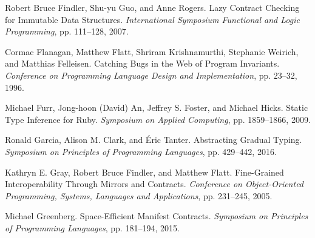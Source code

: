\documentclass[screen=true, 10pt, acmsmall]{acmart}
\newenvironment{SingleColumn}{\begin{list}{}{\topsep=0pt\partopsep=0pt%
\listparindent=0pt\itemindent=0pt\labelwidth=0pt\leftmargin=0pt\rightmargin=0pt%
\itemsep=0pt\parsep=0pt}\item}{\end{list}}
\newenvironment{AutoBibliography}{\begin{small}}{\end{small}}
\newcommand{\Autobibentry}[1]{\hspace{0.05\linewidth}\parbox[t]{0.95\linewidth}{\parindent=-0.05\linewidth#1\vspace{1.0ex}}}
\begin{document}
\begin{AutoBibliography}
\begin{SingleColumn}
\label{t:x28autobib_x22Robert_Bruce_Findlerx2c_Shux2dyu_Guox2c_and_Anne_RogersLazy_Contract_Checking_for_Immutable_Data_StructuresInternational_Symposium_Functional_and_Logic_Programmingx2c_ppx2e_111x2dx2d1282007x22x29}\Autobibentry{Robert Bruce Findler, Shu{-}yu Guo, and Anne Rogers. Lazy Contract Checking for Immutable Data Structures. \textit{International Symposium Functional and Logic Programming}, pp. 111{--}128, 2007.}

\label{t:x28autobib_x22Cormac_Flanaganx2c_Matthew_Flattx2c_Shriram_Krishnamurthix2c_Stephanie_Weirichx2c_and_Matthias_FelleisenCatching_Bugs_in_the_Web_of_Program_InvariantsConference_on_Programming_Language_Design_and_Implementationx2c_ppx2e_23x2dx2d321996x22x29}\Autobibentry{Cormac Flanagan, Matthew Flatt, Shriram Krishnamurthi, Stephanie Weirich, and Matthias Felleisen. Catching Bugs in the Web of Program Invariants. \textit{Conference on Programming Language Design and Implementation}, pp. 23{--}32, 1996.}

\label{t:x28autobib_x22Michael_Furrx2c_Jongx2dhoon_x28Davidx29_Anx2c_Jeffrey_Sx2e_Fosterx2c_and_Michael_HicksStatic_Type_Inference_for_RubySymposium_on_Applied_Computingx2c_ppx2e_1859x2dx2d18662009x22x29}\Autobibentry{Michael Furr, Jong{-}hoon (David) An, Jeffrey S. Foster, and Michael Hicks. Static Type Inference for Ruby. \textit{Symposium on Applied Computing}, pp. 1859{--}1866, 2009.}

\label{t:x28autobib_x22Ronald_Garciax2c_Alison_Mx2e_Clarkx2c_and_xc9ric_TanterAbstracting_Gradual_TypingSymposium_on_Principles_of_Programming_Languagesx2c_ppx2e_429x2dx2d4422016x22x29}\Autobibentry{Ronald Garcia, Alison M. Clark, and \'{E}ric Tanter. Abstracting Gradual Typing. \textit{Symposium on Principles of Programming Languages}, pp. 429{--}442, 2016.}

\label{t:x28autobib_x22Kathryn_Ex2e_Grayx2c_Robert_Bruce_Findlerx2c_and_Matthew_FlattFinex2dGrained_Interoperability_Through_Mirrors_and_ContractsConference_on_Objectx2dOriented_Programmingx2c_Systemsx2c_Languages_and_Applicationsx2c_ppx2e_231x2dx2d2452005x22x29}\Autobibentry{Kathryn E. Gray, Robert Bruce Findler, and Matthew Flatt. Fine{-}Grained Interoperability Through Mirrors and Contracts. \textit{Conference on Object{-}Oriented Programming, Systems, Languages and Applications}, pp. 231{--}245, 2005.}

\label{t:x28autobib_x22Michael_GreenbergSpacex2dEfficient_Manifest_ContractsSymposium_on_Principles_of_Programming_Languagesx2c_ppx2e_181x2dx2d1942015x22x29}\Autobibentry{Michael Greenberg. Space{-}Efficient Manifest Contracts. \textit{Symposium on Principles of Programming Languages}, pp. 181{--}194, 2015.}


\end{SingleColumn}
\end{AutoBibliography}
\end{document}
